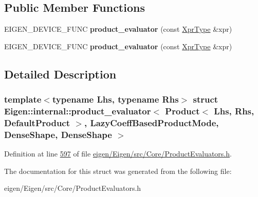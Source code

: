 \subsection*{Public Member Functions}
\begin{DoxyCompactItemize}
\item 
\mbox{\label{struct_eigen_1_1internal_1_1product__evaluator_3_01_product_3_01_lhs_00_01_rhs_00_01_default_pro06ca9210bc576c533682d6dfc3cec111_a49e30ab3bd6c6cecebdbd4e97f24a824}} 
E\+I\+G\+E\+N\+\_\+\+D\+E\+V\+I\+C\+E\+\_\+\+F\+U\+NC {\bfseries product\+\_\+evaluator} (const \hyperlink{group___core___module_class_eigen_1_1_product}{Xpr\+Type} \&xpr)
\item 
\mbox{\label{struct_eigen_1_1internal_1_1product__evaluator_3_01_product_3_01_lhs_00_01_rhs_00_01_default_pro06ca9210bc576c533682d6dfc3cec111_a49e30ab3bd6c6cecebdbd4e97f24a824}} 
E\+I\+G\+E\+N\+\_\+\+D\+E\+V\+I\+C\+E\+\_\+\+F\+U\+NC {\bfseries product\+\_\+evaluator} (const \hyperlink{group___core___module_class_eigen_1_1_product}{Xpr\+Type} \&xpr)
\end{DoxyCompactItemize}


\subsection{Detailed Description}
\subsubsection*{template$<$typename Lhs, typename Rhs$>$\newline
struct Eigen\+::internal\+::product\+\_\+evaluator$<$ Product$<$ Lhs, Rhs, Default\+Product $>$, Lazy\+Coeff\+Based\+Product\+Mode, Dense\+Shape, Dense\+Shape $>$}



Definition at line \hyperlink{eigen_2_eigen_2src_2_core_2_product_evaluators_8h_source_l00597}{597} of file \hyperlink{eigen_2_eigen_2src_2_core_2_product_evaluators_8h_source}{eigen/\+Eigen/src/\+Core/\+Product\+Evaluators.\+h}.



The documentation for this struct was generated from the following file\+:\begin{DoxyCompactItemize}
\item 
eigen/\+Eigen/src/\+Core/\+Product\+Evaluators.\+h\end{DoxyCompactItemize}
